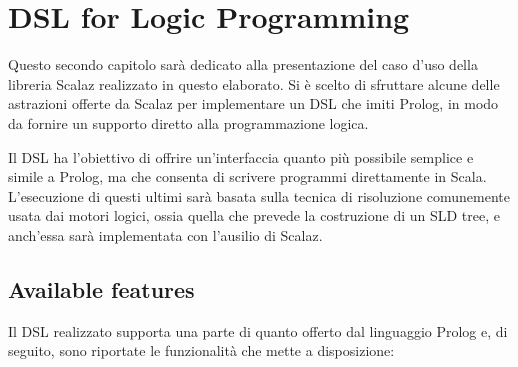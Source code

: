 \chapter{DSL for Logic Programming} %

\label{Chapter2} %

Questo secondo capitolo sarà dedicato alla presentazione del caso d'uso della libreria Scalaz realizzato in questo elaborato. Si è scelto di sfruttare alcune delle astrazioni offerte da Scalaz per implementare un DSL che imiti Prolog, in modo da fornire un supporto diretto alla programmazione logica.

Il DSL ha l'obiettivo di offrire un'interfaccia quanto più possibile semplice e simile a Prolog, ma che consenta di scrivere programmi direttamente in Scala. L'esecuzione di questi ultimi sarà basata sulla tecnica di risoluzione comunemente usata dai motori logici, ossia quella che prevede la costruzione di un SLD tree, e anch'essa sarà implementata con l'ausilio di Scalaz.


\section{Available features}

Il DSL realizzato supporta una parte di quanto offerto dal linguaggio Prolog e, di seguito, sono riportate le funzionalità che mette a disposizione:

